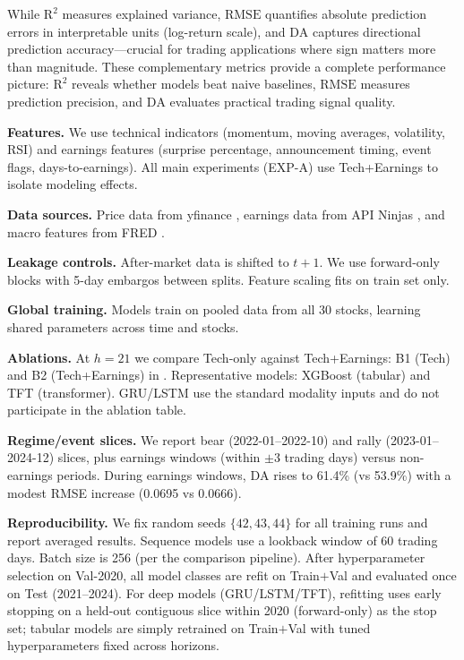 \documentclass[conference,a4paper]{IEEEtran}
\newcommand{\rmse}{\ensuremath{\mathrm{RMSE}}}
\newcommand{\rTwo}{\ensuremath{\mathrm{R}^2}}
\newcommand{\da}{\ensuremath{\mathrm{DA}}}
\begin{document}
    	While $\rTwo$ measures explained variance, \rmse{} quantifies absolute prediction errors in interpretable units (log-return scale), and \da{} captures directional prediction accuracy—crucial for trading applications where sign matters more than magnitude. These complementary metrics provide a complete performance picture: $\rTwo$ reveals whether models beat naive baselines, \rmse{} measures prediction precision, and \da{} evaluates practical trading signal quality.

    	\textbf{Features.} We use technical indicators (momentum, moving averages, volatility, RSI) and earnings features (surprise percentage, announcement timing, event flags, days-to-earnings). All main experiments (EXP-A) use Tech+Earnings to isolate modeling effects.

    	\textbf{Data sources.} Price data from yfinance \citep{yfinance2022}, earnings data from API Ninjas \citep{ninjas2024api}, and macro features from FRED \citep{mortada2023fredapi}.

    	\textbf{Leakage controls.} After-market data is shifted to $t+1$. We use forward-only blocks with 5-day embargos between splits. Feature scaling fits on train set only.

        \textbf{Global training.} Models train on pooled data from all 30 stocks, learning shared parameters across time and stocks.

    	\textbf{Ablations.} At $h{=}21$ we compare Tech-only against Tech+Earnings: B1 (Tech) and B2 (Tech+Earnings) in . Representative models: XGBoost (tabular) and TFT (transformer). GRU/LSTM use the standard modality inputs and do not participate in the ablation table.

    	\textbf{Regime/event slices.} We report bear (2022-01--2022-10) and rally (2023-01--2024-12) slices, plus earnings windows (within $\pm3$ trading days) versus non-earnings periods. During earnings windows, \da{} rises to 61.4\% (vs 53.9\%) with a modest RMSE increase (0.0695 vs 0.0666).

	\textbf{Reproducibility.} We fix random seeds $\{42,43,44\}$ for all training runs and report averaged results. Sequence models use a lookback window of 60 trading days. Batch size is 256 (per the comparison pipeline). After hyperparameter selection on Val-2020, all model classes are refit on Train$+$Val and evaluated once on Test (2021--2024). For deep models (GRU/LSTM/TFT), refitting uses early stopping on a held-out contiguous slice within 2020 (forward-only) as the stop set; tabular models are simply retrained on Train$+$Val with tuned hyperparameters fixed across horizons.
\end{document}

